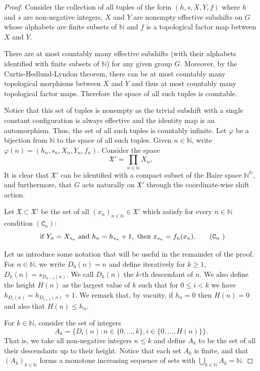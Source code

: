 \documentclass{article}
\theoremstyle{definition}
\theoremstyle{plain}
\newcommand{\NN}{\mathbb{N}}
\begin{document}
    \begin{proof}
        Consider the collection of all tuples of the form $(h,s,X,Y,f)$ where $h$ and $s$ are non-negative integers, $X$ and $Y$ are nonempty effective subshifts on $G$ whose alphabets are finite subsets of $\NN$ and $f$ is a topological factor map between $X$ and $Y$.

        There are at most countably many effective subshifts (with their alphabets identified with finite subsets of $\NN$) for any given group $G$. Moreover, by the Curtis-Hedlund-Lyndon theorem, there can be at most countably many topological morphisms between $X$ and $Y$ and thus at most countably many topological factor maps. Therefore the space of all such tuples is countable.
        
        Notice that this set of tuples is nonempty as the trivial subshift with a single constant configuration is always effective and the identity map is an automorphism. Thus, the set of all such tuples is countably infinite. Let $\varphi$ be a bijection from $\NN$ to the space of all such tuples. Given $n \in \NN$, write $\varphi(n) = (h_n,s_n,X_n,Y_n,f_n)$.
        Consider the space \[ \mathfrak{X}' = \prod_{n \in \NN} X_n, \]
        It is clear that $\mathfrak{X}'$ can be identified with a compact subset of the Baire space $\NN^{\NN}$, and furthermore, that $G$ acts naturally on $\mathfrak{X}'$ through the coordinate-wise shift action.

        Let $\mathfrak{X}\subset \mathfrak{X}'$ be the set of all $(x_n)_{n \in \NN}\in \mathfrak{X}'$ which satisfy for every $n 
        \in \NN$ condition $(\mathtt{C}_n)$: \begin{equation}
            \mbox{ if } Y_n = X_{s_n} \mbox{ and } h_n = h_{s_n}+1, \mbox{ then } x_{s_n} = f_n(x_n).\tag{$\mathtt{C}_n$ }
        \end{equation}

        Let us introduce some notation that will be useful in the remainder of the proof. For $n \in \NN$, we write $D_0(n) = n$ and define iteratively for $k \geq 1$, $D_k(n)= s_{D_{k-1}(n)}$. We call $D_k(n)$ the $k$-th descendant of $n$. We also define the height $H(n)$ as the largest value of $k$ such that for $0 \leq i < k$ we have $h_{D_i(n)} = h_{D_{i+1}(n)}+1$. We remark that, by vacuity, if $h_n=0$ then $H(n)=0$ and also that $H(n) \leq h_n$.
        
        For $k \in \NN$, consider the set of integers \[ A_k = \{ D_i(n) : n \in \{0,\dots,k\}, i \in \{0,\dots,H(n)\} \}.    \]
        That is, we take all non-negative integers $n \leq k$ and define $A_k$ to be the set of all their descendants up to their height. Notice that each set $A_k$ is finite, and that $(A_k)_{k \in \NN}$ forms a monotone increasing sequence of sets with $\bigcup_{k \in \NN}A_k = \NN$.


\end{proof}
\end{document}

